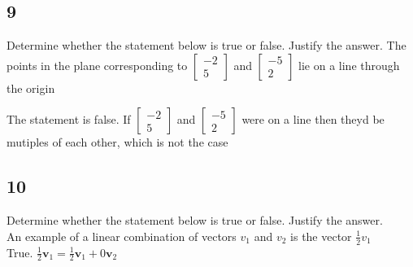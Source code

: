 \documentclass{article}
\begin{document}
\subsection*{9}
Determine whether the statement below is true or false. Justify the answer.
The points in the plane corresponding to $\left[\begin{array}{c}
    -2\\5
\end{array}\right]$ and $\left[\begin{array}{c}
    -5\\2
\end{array}\right]$ lie on a line through the origin

The statement is false. If $\left[\begin{array}{c}
    -2\\5
\end{array}\right]$ and $\left[\begin{array}{c}
    -5\\2
\end{array}\right]$ were on a line then theyd be mutiples of each other, which is not the case
\subsection*{10}
Determine whether the statement below is true or false. Justify the answer.
\\An example of a linear combination of vectors $v_1$ and $v_2$   is the vector $\frac{1}{2}v_1$
\\True. $\frac{1}{2} \mathbf{v}_1 = \frac{1}{2} \mathbf{v}_1 + 0 \mathbf{v}_2$
\end{document}

